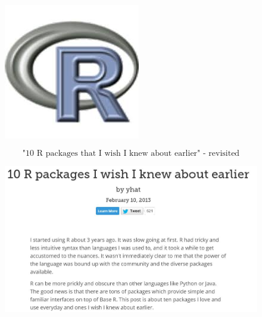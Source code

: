 \documentclass{beamer}
\begin{document}
	
	\begin{frame}
		\begin{figure}
			\centering
			\includegraphics[width=0.6\linewidth]{rlogo}
		\end{figure}
		\large
		\[ \mbox{"10 R packages that I wish I knew about earlier" - revisited} \] \bigskip
		
	\end{frame}
\begin{frame}
	\begin{figure}
		\centering
		\includegraphics[width=1.05\linewidth]{tenpackintro01}
		
	\end{figure}
	
\end{frame}
\end{document}
